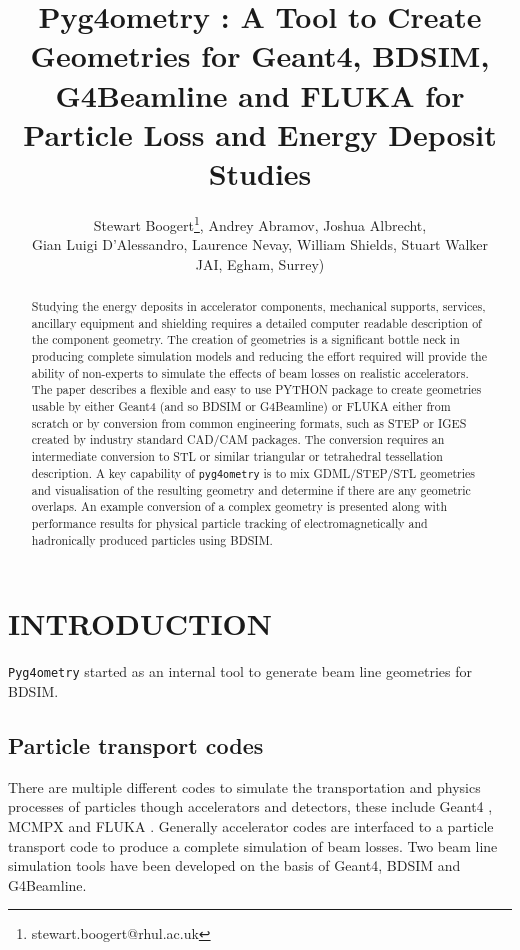 \documentclass[a4paper,
               keeplastbox,   %
               ]{jacow}
\begin{document}
\title{Pyg4ometry : A Tool to Create Geometries for Geant4, BDSIM, G4Beamline and FLUKA for Particle Loss and Energy Deposit Studies}

\author{Stewart Boogert\thanks{stewart.boogert@rhul.ac.uk}, Andrey Abramov, Joshua Albrecht, \\ Gian Luigi D'Alessandro, Laurence Nevay, William Shields, Stuart Walker \\
JAI, Egham, Surrey)}
	
\maketitle

%
\begin{abstract}
Studying the energy deposits in accelerator components, mechanical supports, services, ancillary equipment and shielding requires a detailed computer readable description of the component geometry. The creation of geometries is a significant bottle neck in producing complete simulation models and reducing the effort required will provide the ability of non-experts to simulate the effects of beam losses on realistic accelerators. The paper describes a flexible and easy to use PYTHON package to create geometries usable by either Geant4 (and so BDSIM or G4Beamline) or FLUKA either from scratch or by conversion from common engineering formats, such as STEP or IGES created by industry standard CAD/CAM packages. The conversion requires an intermediate conversion to STL or similar triangular or tetrahedral tessellation description. A key capability of \verb|pyg4ometry| is to mix GDML/STEP/STL geometries and visualisation of the resulting geometry and determine if there are any geometric overlaps. An example conversion of a complex geometry is presented along with performance results for physical particle tracking of electromagnetically and hadronically produced particles using BDSIM.
\end{abstract}


\section{INTRODUCTION}
\verb|Pyg4ometry| started as an internal tool to generate beam line geometries for BDSIM. 

\subsection{Particle transport codes}
There are multiple different codes to simulate the transportation and physics processes of particles though accelerators and detectors, these include Geant4 \cite{geant4}, MCMPX and FLUKA \cite{fluka}. Generally accelerator codes are interfaced  to a particle transport code to produce a complete simulation of beam losses. Two beam line simulation tools have been developed on the basis of Geant4, BDSIM and G4Beamline.   
\end{document}

